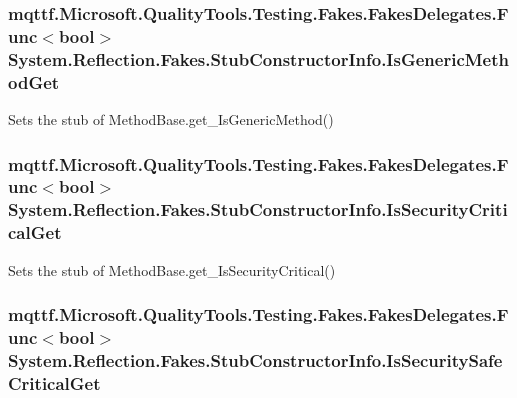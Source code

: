 \hypertarget{class_system_1_1_reflection_1_1_fakes_1_1_stub_constructor_info_af009a6e8835d611fcc19abb3960b4dac}{
\subsubsection[{Is\-Generic\-Method\-Get}]{\setlength{\rightskip}{0pt plus 5cm}mqttf.\-Microsoft.\-Quality\-Tools.\-Testing.\-Fakes.\-Fakes\-Delegates.\-Func$<$bool$>$ System.\-Reflection.\-Fakes.\-Stub\-Constructor\-Info.\-Is\-Generic\-Method\-Get}}\label{class_system_1_1_reflection_1_1_fakes_1_1_stub_constructor_info_af009a6e8835d611fcc19abb3960b4dac}


Sets the stub of Method\-Base.\-get\-\_\-\-Is\-Generic\-Method()

\hypertarget{class_system_1_1_reflection_1_1_fakes_1_1_stub_constructor_info_a023e4633d86b9b3da9750848683f17f8}{
\subsubsection[{Is\-Security\-Critical\-Get}]{\setlength{\rightskip}{0pt plus 5cm}mqttf.\-Microsoft.\-Quality\-Tools.\-Testing.\-Fakes.\-Fakes\-Delegates.\-Func$<$bool$>$ System.\-Reflection.\-Fakes.\-Stub\-Constructor\-Info.\-Is\-Security\-Critical\-Get}}\label{class_system_1_1_reflection_1_1_fakes_1_1_stub_constructor_info_a023e4633d86b9b3da9750848683f17f8}


Sets the stub of Method\-Base.\-get\-\_\-\-Is\-Security\-Critical()

\hypertarget{class_system_1_1_reflection_1_1_fakes_1_1_stub_constructor_info_a4913b539a6f38f233a3fd742d8b6dbf8}{
\subsubsection[{Is\-Security\-Safe\-Critical\-Get}]{\setlength{\rightskip}{0pt plus 5cm}mqttf.\-Microsoft.\-Quality\-Tools.\-Testing.\-Fakes.\-Fakes\-Delegates.\-Func$<$bool$>$ System.\-Reflection.\-Fakes.\-Stub\-Constructor\-Info.\-Is\-Security\-Safe\-Critical\-Get}}\label{class_system_1_1_reflection_1_1_fakes_1_1_stub_constructor_info_a4913b539a6f38f233a3fd742d8b6dbf8}


